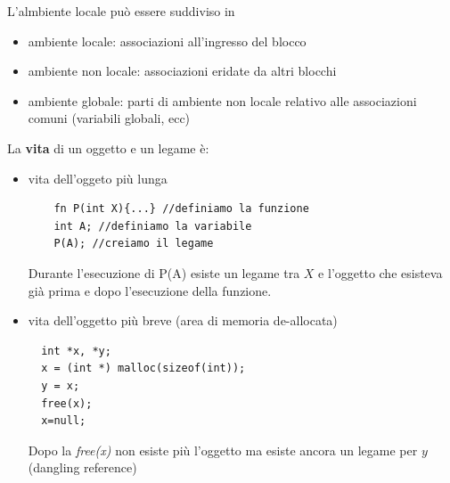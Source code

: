 \documentclass[a4paper,12pt]{article}
\begin{document}
L'almbiente locale può essere suddiviso in 
\begin{itemize}
  \item ambiente locale: associazioni all'ingresso del blocco
  \item ambiente non locale: associazioni eridate da altri blocchi
  \item ambiente globale: parti di ambiente non locale relativo alle associazioni comuni (variabili globali, ecc)
\end{itemize}
La \textbf{vita} di un oggetto e un legame è: 
\begin{itemize}
  \item vita dell'oggeto più lunga
  \begin{lstlisting}
    fn P(int X){...} //definiamo la funzione
    int A; //definiamo la variabile
    P(A); //creiamo il legame
  \end{lstlisting}
  Durante l'esecuzione di P(A) esiste un legame tra $X$ e l'oggetto che esisteva già prima e dopo l'esecuzione della funzione.
  \item vita dell'oggetto più breve (area di memoria de-allocata)
  \begin{lstlisting}
  int *x, *y;
  x = (int *) malloc(sizeof(int));
  y = x;
  free(x);
  x=null;
  \end{lstlisting}
  Dopo la \textit{free(x)} non esiste più l'oggetto ma esiste ancora un legame per $y$ (dangling reference)
\end{itemize}
\end{document}
